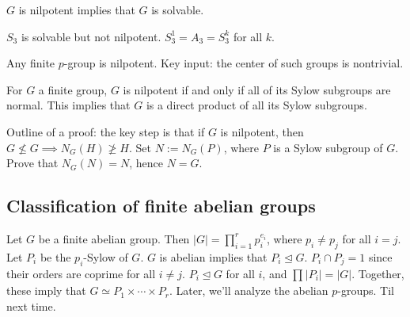 \begin{prop}
    $G$ is nilpotent implies that $G$ is solvable.
\end{prop}
\begin{example}
    $S_3$ is solvable but not nilpotent. $S_3^1=A_3=S_3^k$ for all $k$.
\end{example}
\begin{example}
    Any finite $p$-group is nilpotent. Key input: the center of such groups is nontrivial.
\end{example}
\begin{theorem}
    For $G$ a finite group, $G$ is nilpotent if and only if all of its Sylow subgroups are normal. This implies that $G$ is a direct product of all its Sylow subgroups.
\end{theorem}
Outline of a proof: the key step is that if $G$ is nilpotent, then $G\not\leq G\implies N_G(H)\not\geq H$. Set $N:=N_G(P)$, where $P$ is a Sylow subgroup of $G$. Prove that $N_G(N)=N$, hence $N=G$.
\subsection{Classification of finite abelian groups}
Let $G$ be a finite abelian group. Then $|G|=\prod_{i=1}^{r} p_i^{e_i} $, where $p_i\neq p_j$ for all $i=j$. Let $P_i$ be the $p_i$-Sylow of $G$. $G$ is abelian implies that $P_i\trianglelefteq G$. $P_i\cap P_j=1$ since their orders are coprime for all $i\neq j$. $P_i\trianglelefteq G$ for all $i$, and $\prod_{}^{} |P_i|=|G| $. Together, these imply that $G\simeq P_1\times \cdots\times P_r$. Later, we'll analyze the abelian $p$-groups. Til next time.
